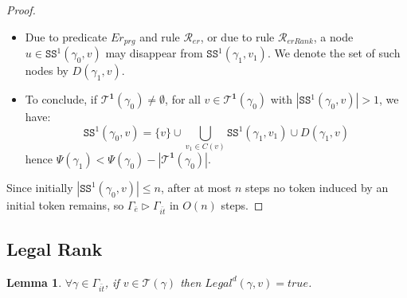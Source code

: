\documentclass[a4paper, 12pt]{article}
\newtheorem{lemma}[theorem]{Lemma}
\newcommand{\bo}{\mathbf{1}}
\newcommand{\Ss}{\texttt{SS}^1}
\newcommand{\Rer}{$\mathscr{R}_{er}$}
\newcommand{\RerRank}{$\mathscr{R}_{erRank}$}
\newcommand{\Rjoin}{$\mathscr{R}_{join}$}
\begin{document}
\begin{proof}
\begin{itemize}
\begin{itemize}
    \item \textbf{Case 2: $u \notin \Ss(\gamma_0, v)$, not a 
    descendant of $v$, but with a neighbor $w \in \Ss(\gamma_0, v)$} 
    (node $u_2$ in Figure~\ref{fig:SS1}). Node $u$ is either a parent, 
    a sibling, or a reset node of $w$. For $u$ to become a descendant 
    of $v_1$ in $\gamma_1$, it must update its rank. Since only reset 
    nodes can adopt a new rank, parents and siblings of $w$ cannot join 
    $\Ss(\gamma_1, v_1)$. In $\Ss(\gamma_0, v)$, only 
    $v$ holds a token, which implies $w = v$. Consequently, the reset 
    node $u$ becomes a child of $v$; but since \Rjoin\ does not set 
    $t_u := \mathit{true}$, node $u$ holds no token and does not belong 
    to any $\Ss(\gamma_1, z)$ for any $z \in V$.

\end{itemize}

\item Due to predicate $Er_{prg}$ and rule \Rer, or due to rule 
\RerRank, a node $u \in \Ss(\gamma_0, v)$ may disappear from 
$\Ss(\gamma_1, v_1)$. We denote the set of such nodes by 
$D(\gamma_1, v)$.

\item To conclude, if $\mathcal{T}^{\bo}(\gamma_0) \neq \emptyset$, 
for all $v \in \mathcal{T}^{\bo}(\gamma_0)$ with 
$|\Ss(\gamma_0, v)| > 1$, we have:
$$\Ss(\gamma_0, v) = \{v\} \cup 
\bigcup_{v_1 \in C(v)} \Ss(\gamma_1, v_1) \cup D(\gamma_1, v)$$
hence $\Psi(\gamma_1) < \Psi(\gamma_0) - |\mathcal{T}^{\bo}(\gamma_0)|$.

\end{itemize}

Since initially $|\Ss(\gamma_0, v)| \leq n$, after at most $n$ 
steps no token induced by an initial token remains, so 
$\Gamma_{\bar{e}} \triangleright \Gamma_{\bar{it}}$ in $O(n)$ steps.
\end{proof}
\subsection{Legal Rank}
\label{subsec:legalrank}

\begin{lemma}
\label{lem:disRoot}
$\forall \gamma \in \Gamma_{\bar{it}}$, if $v \in \mathcal{T}(\gamma)$ then 
$Legal^d(\gamma, v) = \mathit{true}$.
\end{lemma}
\end{document}

